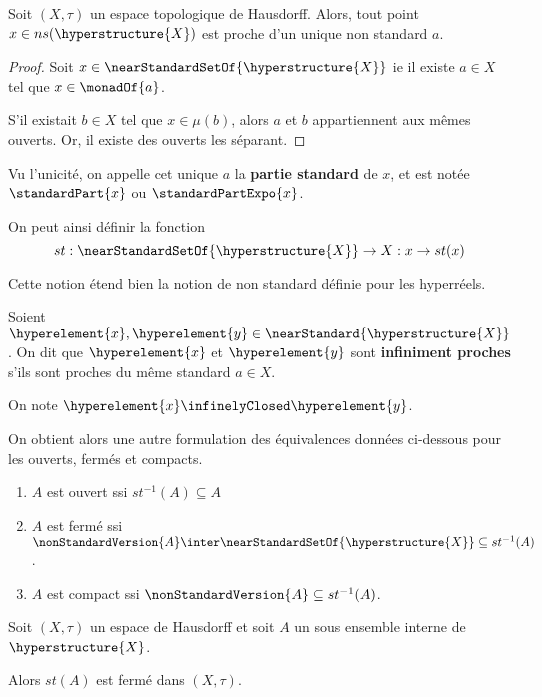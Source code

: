 \begin{proposition}
	Soit $(X, \tau)$ un espace topologique de Hausdorff. Alors, tout point $x
	\in ns(\hyperstructure{X})$ est proche d'un unique non standard $a$.
\end{proposition}

\ifdefined\outputproof
\begin{proof}
	Soit $x \in \nearStandardSetOf{\hyperstructure{X}}$ ie il existe $a \in X$
	tel que $x \in \monadOf{a}$.

	S'il existait $b \in X$ tel que $x \in \mu(b)$, alors $a$ et $b$
	appartiennent aux mêmes ouverts. Or, il existe des ouverts les séparant.
\end{proof}
\fi

Vu l'unicité, on appelle cet unique $a$ la \textbf{partie
standard} de $x$, et est notée $\standardPart{x}$ ou $\standardPartExpo{x}$.

On peut ainsi définir la fonction
\begin{equation}
	st : \nearStandardSetOf{\hyperstructure{X}} \rightarrow X : x \rightarrow st(x)
\end{equation}

Cette notion étend bien la notion de non standard définie pour les hyperréels.

\begin{definition} 
	Soient $\hyperelement{x}, \hyperelement{y} \in
	\nearStandard{\hyperstructure{X}}$. On dit que $\hyperelement{x}$ et
	$\hyperelement{y}$ sont \textbf{infiniment proches}
	s'ils sont proches du même standard $a \in X$.

	On note $\hyperelement{x} \infinelyClosed \hyperelement{y}$.
\end{definition}

On obtient alors une autre formulation des équivalences données ci-dessous pour
les ouverts, fermés et compacts.

\begin{enumerate}
	\item $A$ est ouvert ssi $st^{-1}(A) \subseteq A$
	\item $A$ est fermé ssi $\nonStandardVersion{A} \inter
		\nearStandardSetOf{\hyperstructure{X}} \subseteq st^{-1}(A)$.
	\item $A$ est compact ssi $\nonStandardVersion{A} \subseteq st^{-1}(A)$.
\end{enumerate}

\begin{proposition}
	Soit $(X, \tau)$ un espace de Hausdorff et soit $A$ un sous ensemble interne
	de $\hyperstructure{X}$.

	Alors $st(A)$ est fermé dans $(X, \tau)$.
\end{proposition}

